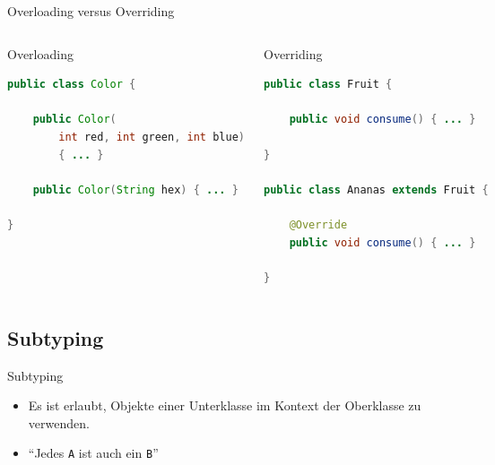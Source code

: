 \documentclass[18pt]{beamer}
\newcommand{\quotes}[1]{``#1''}
\begin{document}
\begin{frame}[fragile]{Overloading versus Overriding}
    \begin{columns}[c]
        \begin{exampleblock}{Overloading}
            \begin{lstlisting}[language=Java,basicstyle=\scriptsize]
public class Color {

    public Color(
        int red, int green, int blue)
        { ... }

    public Color(String hex) { ... }

}
            \end{lstlisting}

        \end{exampleblock}


        \begin{exampleblock}{Overriding}
            \begin{lstlisting}[language=Java,basicstyle=\scriptsize]
public class Fruit {

    public void consume() { ... }

}

public class Ananas extends Fruit {

    @Override
    public void consume() { ... }

}
            \end{lstlisting}

        \end{exampleblock}

    \end{columns}
\end{frame}


\subsection{Subtyping}

\begin{frame}{Subtyping}
    \begin{block}{}
        \begin{itemize}
            \item Es ist erlaubt, Objekte einer Unterklasse im Kontext der Oberklasse zu verwenden.
            \item \quotes{Jedes \texttt{A} ist auch ein \texttt{B}}
        \end{itemize}
    \end{block}

\end{frame}
\end{document}
